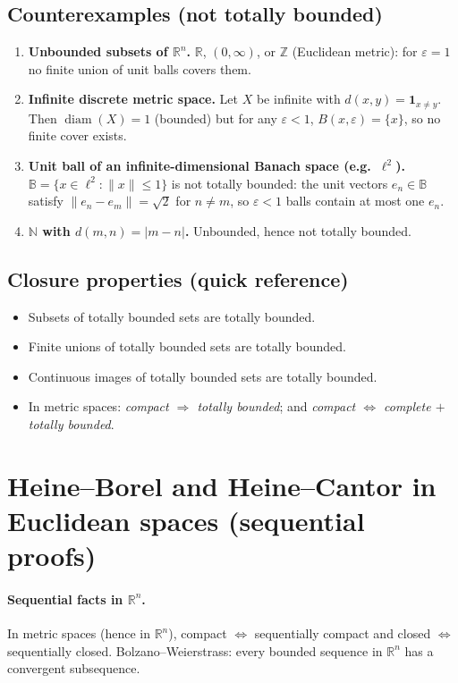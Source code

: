 \documentclass[12pt,a4paper]{article}
\begin{document}
\subsection*{Counterexamples (not totally bounded)}
\begin{enumerate}
	\item \textbf{Unbounded subsets of $\mathbb{R}^n$.}
	$\mathbb{R}$, $(0,\infty)$, or $\mathbb{Z}$ (Euclidean metric): for $\varepsilon=1$ no finite union of unit balls covers them.
	
	\item \textbf{Infinite discrete metric space.}
	Let $X$ be infinite with $d(x,y)=\mathbf{1}_{x\ne y}$. Then $\operatorname{diam}(X)=1$ (bounded) but for any $\varepsilon<1$,
	$B(x,\varepsilon)=\{x\}$, so no finite cover exists.
	
	\item \textbf{Unit ball of an infinite-dimensional Banach space (e.g.\ $\ell^2$).}
	$\mathbb{B}=\{x\in\ell^2:\|x\|\le1\}$ is not totally bounded: the unit vectors $e_n\in\mathbb{B}$ satisfy
	$\|e_n-e_m\|=\sqrt2$ for $n\ne m$, so $\varepsilon<1$ balls contain at most one $e_n$.
	
	\item \textbf{$\mathbb{N}$ with $d(m,n)=|m-n|$.}
	Unbounded, hence not totally bounded.
\end{enumerate}

\subsection*{Closure properties (quick reference)}
\begin{itemize}
	\item Subsets of totally bounded sets are totally bounded.
	\item Finite unions of totally bounded sets are totally bounded.
	\item Continuous images of totally bounded sets are totally bounded.
	\item In metric spaces: \emph{compact $\Rightarrow$ totally bounded}; and \emph{compact $\Leftrightarrow$ complete $+$ totally bounded}.
\end{itemize}

\section*{Heine--Borel and Heine--Cantor in Euclidean spaces (sequential proofs)}

\paragraph{Sequential facts in $\mathbb{R}^n$.}
In metric spaces (hence in $\mathbb{R}^n$), compact $\Leftrightarrow$ sequentially compact and
closed $\Leftrightarrow$ sequentially closed. Bolzano--Weierstrass: every bounded sequence in $\mathbb{R}^n$
has a convergent subsequence.
\end{document}
